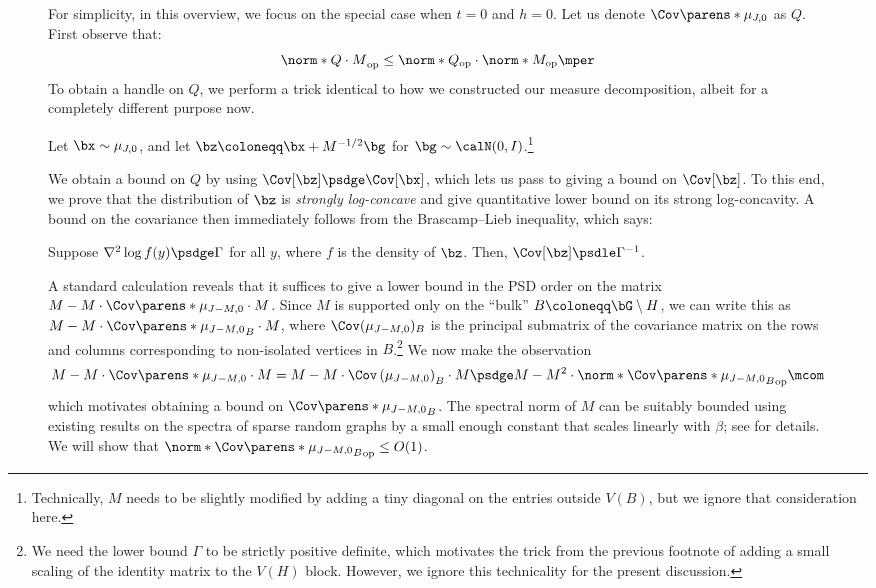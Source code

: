 \documentclass[11pt,letterpaper]{article}
\begin{document}
\begin{figure}
For simplicity, in this overview, we focus on the special case when $t = 0$ and $h = 0$.
Let us denote $\Cov\parens*{\mu_{J,0}}$ as $Q$.
First observe that:
\[
    \norm*{Q \cdot M}_{\mathrm{op}} \le \norm*{Q}_{\mathrm{op}}\cdot\norm*{M}_{\mathrm{op}}\mper
\]
To obtain a handle on $Q$, we perform a trick identical to how we constructed our measure decomposition, albeit for a completely different purpose now.
\begin{displayquote}
    Let $\bx\sim\mu_{J,0}$, and let $\bz\coloneqq \bx + M^{-1/2}\bg$ for $\bg\sim\calN(0,I)$.\footnote{Technically, $M$ needs to be slightly modified by adding a tiny diagonal on the entries outside $V(B)$, but we ignore that consideration here.}
\end{displayquote}
We obtain a bound on $Q$ by using $\Cov[\bz] \psdge \Cov[\bx]$, which lets us pass to giving a bound on $\Cov[\bz]$.
To this end, we prove that the distribution of $\bz$ is \emph{strongly log-concave} and give quantitative lower bound on its strong log-concavity.
A bound on the covariance then immediately follows from the Brascamp--Lieb inequality, which says:
\begin{displayquote}
    Suppose $\nabla^2 \log f(y) \psdge \Gamma$ for all $y$, where $f$ is the density of $\bz$. Then, $\Cov[\bz]\psdle\Gamma^{-1}$.
\end{displayquote}
A standard calculation reveals that it suffices to give a lower bound in the PSD order on the matrix $M - M\cdot\Cov\parens*{\mu_{J-M,0}}\cdot M$.
Since $M$ is supported only on the ``bulk'' $B\coloneqq \bG\setminus H$, we can write this as $M - M\cdot\Cov\parens*{\mu_{J-M,0}}_{B}\cdot M$, where $\Cov(\mu_{J-M,0})_{B}$ is the principal submatrix of the covariance matrix on the rows and columns corresponding to non-isolated vertices in $B$.\footnote{We need the lower bound $\Gamma$ to be strictly positive definite, which motivates the trick from the previous footnote of adding a small scaling of the identity matrix to the $V(H)$ block.
However, we ignore this technicality for the present discussion.
}
We now make the observation
\[
    M - M\cdot\Cov\parens*{\mu_{J-M,0}}\cdot M = M - M \cdot \Cov\left( \mu_{J-M,0} \right)_B \cdot M \psdge M - M^2 \cdot \norm*{\Cov\parens*{\mu_{J-M,0}}_B}_{\mathrm{op}}\mcom
\]
which motivates obtaining a bound on $\Cov\parens*{\mu_{J-M,0}}_{B}$.
The spectral norm of $M$ can be suitably bounded using existing results on the spectra of sparse random graphs by a small enough constant that scales linearly with $\beta$; see  for details.
We will show that $\norm*{\Cov\parens*{\mu_{J-M,0}}_{B}}_{\mathrm{op}}\le O(1)$.


\end{figure}
\end{document}
